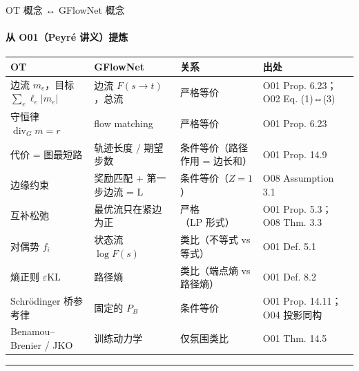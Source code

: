 \documentclass[aspectratio=169,10pt]{beamer}
\newcommand{\pos}[1]{\textcolor{positive}{#1}}
\newcommand{\con}[1]{\textcolor{negative}{#1}}
\begin{document}
\begin{frame}{OT 概念 ↔ GFlowNet 概念}\framesubtitle{从 O01（Peyré 讲义）提炼}
{\scriptsize\setlength{\tabcolsep}{3pt}\begin{tabular}{@{}>{\RaggedRight\arraybackslash}p{}>{\RaggedRight\arraybackslash}p{}>{\RaggedRight\arraybackslash}p{}>{\RaggedRight\arraybackslash}p{}@{}}\toprule
\textbf{OT} & \textbf{GFlowNet} & \textbf{关系} & \textbf{出处} \\\midrule
边流 $m_e$，目标 $\sum_e\ell_e|m_e|$ & 边流 $F(s\to t)$，总流 & \pos{严格等价} & O01 Prop. 6.23；O02 Eq. (1)⇔(3) \\\addlinespace[2pt]
守恒律 $\operatorname{div}_G m=r$ & flow matching & \pos{严格等价} & O01 Prop. 6.23 \\\addlinespace[2pt]
代价 = 图最短路 & 轨迹长度 / 期望步数 & 条件等价（路径作用 = 边长和） & O01 Prop. 14.9 \\\addlinespace[2pt]
边缘约束 & 奖励匹配 + 第一步边流 = L & 条件等价（$Z=1$） & O08 Assumption 3.1 \\\addlinespace[2pt]
互补松弛 & 最优流只在紧边为正 & \pos{严格}（LP 形式） & O01 Prop. 5.3；O08 Thm. 3.3 \\\addlinespace[2pt]
对偶势 $f_i$ & 状态流 $\log F(s)$ & 类比（不等式 vs 等式） & O01 Def. 5.1 \\\addlinespace[2pt]
熵正则 $\varepsilon\mathrm{KL}$ & 路径熵 & 类比（端点熵 vs 路径熵） & O01 Def. 8.2 \\\addlinespace[2pt]
Schrödinger 桥参考律 & 固定的 $P_B$ & 条件等价 & O01 Prop. 14.11；O04 投影同构 \\\addlinespace[2pt]
Benamou–Brenier / JKO & 训练动力学 & \con{仅氛围类比} & O01 Thm. 14.5 \\\bottomrule\end{tabular}}
\vfill\hrule{}
\end{frame}
\end{document}
